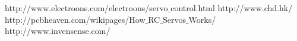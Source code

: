 \begin{thebibliography}{9}

 \label{ref:PWM} http://www.electroons.com/electroons/servo$\_$control.html
 \label{ref:PowerHD} http://www.chd.hk/
 \label{ref:SerCtrl} http://pcbheaven.com/wikipages/How$\_$RC$\_$Servos$\_$Works/
 \label{ref:InSens} http://www.invensense.com/

\end{thebibliography}